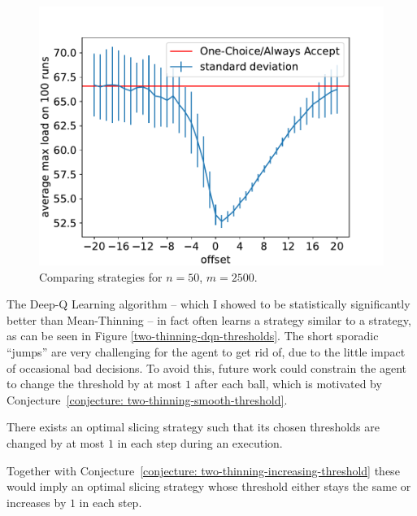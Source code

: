 \begin{figure}[ht]
    \centering
    \includegraphics[scale=0.6]{Chapter4/Figs/offset_analysis_50_2500.pdf}
    \caption{Comparing \ConstantOffset strategies for $n=50$, $m=2500$.}
    \label{two-thinning-constant-offset}
\end{figure}



The Deep-Q Learning algorithm -- which I showed to be statistically significantly better than Mean-Thinning -- in fact often learns a strategy similar to a \ConstantOffset strategy, as can be seen in Figure \ref{two-thinning-dqn-thresholds}. The short sporadic ``jumps'' are very challenging for the agent to get rid of, due to the little impact of occasional bad decisions. To avoid this, future work could constrain the agent to change the threshold by at most $1$ after each ball, which is motivated by Conjecture~\ref{conjecture: two-thinning-smooth-threshold}.


\begin{conjecture}\label{conjecture: two-thinning-smooth-threshold}
There exists an optimal slicing strategy such that its chosen thresholds are changed by at most $1$ in each step during an execution.
\end{conjecture}


\begin{remark}
Together with Conjecture~\ref{conjecture: two-thinning-increasing-threshold} these would imply an optimal slicing strategy whose threshold either stays the same or increases by $1$ in each step.
\end{remark}


